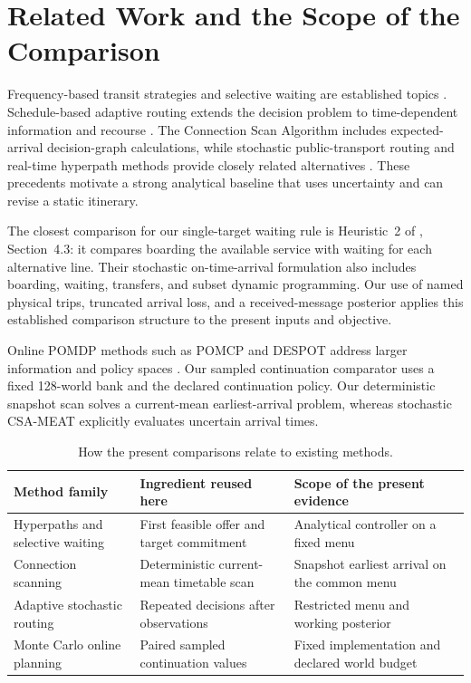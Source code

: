 \documentclass[preprint,12pt,authoryear]{elsarticle}
\begin{document}
\section{Related Work and the Scope of the Comparison}
Frequency-based transit strategies and selective waiting are established topics
\citep{spiess1989,gentile2005,chenNie}. Schedule-based adaptive routing extends
the decision problem to time-dependent information and recourse
\citep{rambha}. The Connection Scan Algorithm includes expected-arrival
decision-graph calculations, while stochastic public-transport routing and
real-time hyperpath methods provide closely related alternatives
\citep{dibbelt2018,geissmann,durner}. These precedents motivate a strong analytical
baseline that uses uncertainty and can revise a static itinerary.

The closest comparison for our single-target waiting rule is Heuristic~2 of
\citet{liu2019}, Section~4.3: it compares boarding the available service with
waiting for each alternative line. Their stochastic on-time-arrival formulation
also includes boarding, waiting, transfers, and subset dynamic programming.
Our use of named physical trips, truncated arrival loss, and a received-message
posterior applies this established comparison structure to the present inputs
and objective.

Online POMDP methods such as POMCP and DESPOT address larger information and
policy spaces \citep{silver,somani2013}. Our sampled continuation comparator uses
a fixed 128-world bank and the declared continuation policy. Our deterministic
snapshot scan solves a current-mean earliest-arrival problem, whereas stochastic
CSA-MEAT explicitly evaluates uncertain arrival times.

\begin{table}[ht]
\centering\small
\caption{How the present comparisons relate to existing methods.}
\begin{tabular}{p{}p{}p{}}
\toprule
Method family & Ingredient reused here & Scope of the present evidence\\
\midrule
Hyperpaths and selective waiting & First feasible offer and target commitment & Analytical controller on a fixed menu\\
Connection scanning & Deterministic current-mean timetable scan & Snapshot earliest arrival on the common menu\\
Adaptive stochastic routing & Repeated decisions after observations & Restricted menu and working posterior\\
Monte Carlo online planning & Paired sampled continuation values & Fixed implementation and declared world budget\\
\bottomrule
\end{tabular}
\end{table}
\end{document}
